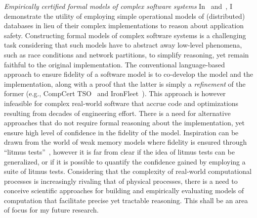 {\itshape\color{MidnightBlue}Empirically certified formal models of
complex software systems} In~\cite{popl18} and~\cite{oopsla18}, I
demonstrate the utility of employing simple operational models of
(distributed) databases in lieu of their complex implementations to
reason about application safety.  Constructing formal models of
complex software systems is a challenging task considering that such
models have to abstract away low-level phenomena, such as race
conditions and network partitions, to simplify reasoning, yet remain
faithful to the original implementation. The conventional
language-based approach to ensure fidelity of a software model is to
co-develop the model and the implementation, along with a proof that
the latter is simply a \emph{refinement} of the former (e.g., CompCert
TSO~\cite{compcerttso} and IronFleet~\cite{ironfleet}). This approach
is however infeasible for complex real-world software that accrue code
and optimizations resulting from decades of engineering effort. There
is a need for alternative approaches that do not require formal
reasoning about the implementation, yet ensure high level of
confidence in the fidelity of the model. Inspiration can be drawn from
the world of weak memory models where fidelity is ensured through
``litmus tests''~\cite{herdingcats}, however it is far from clear if
the idea of litmus tests can be generalized, or if it is possible to
quantify the confidence gained by employing a suite of litmus tests.
Considering that the complexity of real-world computational processes
is increasingly rivaling that of physical processes, there is a need
to conceive scientific approaches for building and empirically
evaluating models of computation that facilitate precise yet tractable
reasoning. This shall be an area of focus for my future research.

